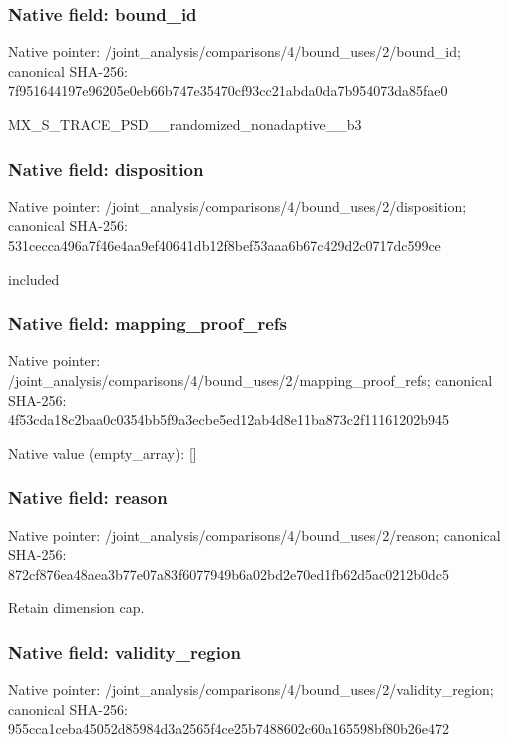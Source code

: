 \documentclass[10pt,a4paper]{article}
\begin{document}
\subsubsection{Native field: bound\_\allowbreak{}id}
Native pointer: /joint\_\allowbreak{}analysis/comparisons/4/bound\_\allowbreak{}uses/2/bound\_\allowbreak{}id; canonical SHA-256: 7f951644197e96205e0eb66b747e35470cf93cc21abda0da7b954073da85fae0

\begingroup\raggedright\sloppy MX\_\allowbreak{}S\_\allowbreak{}TRACE\_\allowbreak{}PSD\_\allowbreak{}\_\allowbreak{}randomized\_\allowbreak{}nonadaptive\_\allowbreak{}\_\allowbreak{}b3\par\endgroup

\subsubsection{Native field: disposition}
Native pointer: /joint\_\allowbreak{}analysis/comparisons/4/bound\_\allowbreak{}uses/2/disposition; canonical SHA-256: 531cecca496a7f46e4aa9ef40641db12f8bef53aaa6b67c429d2c0717dc599ce

\begingroup\raggedright\sloppy included\par\endgroup

\subsubsection{Native field: mapping\_\allowbreak{}proof\_\allowbreak{}refs}
Native pointer: /joint\_\allowbreak{}analysis/comparisons/4/bound\_\allowbreak{}uses/2/mapping\_\allowbreak{}proof\_\allowbreak{}refs; canonical SHA-256: 4f53cda18c2baa0c0354bb5f9a3ecbe5ed12ab4d8e11ba873c2f11161202b945

Native value (empty\_\allowbreak{}array): []

\subsubsection{Native field: reason}
Native pointer: /joint\_\allowbreak{}analysis/comparisons/4/bound\_\allowbreak{}uses/2/reason; canonical SHA-256: 872cf876ea48aea3b77e07a83f6077949b6a02bd2e70ed1fb62d5ac0212b0dc5

\begingroup\raggedright\sloppy Retain dimension cap.\par\endgroup

\subsubsection{Native field: validity\_\allowbreak{}region}
Native pointer: /joint\_\allowbreak{}analysis/comparisons/4/bound\_\allowbreak{}uses/2/validity\_\allowbreak{}region; canonical SHA-256: 955cca1ceba45052d85984d3a2565f4ce25b7488602c60a165598bf80b26e472
\end{document}
